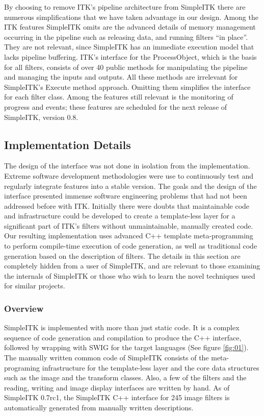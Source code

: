 \documentclass{frontiersMED} %
\begin{document}
By choosing to remove ITK's pipeline architecture from SimpleITK there
are numerous simplifications that we have taken advantage in our
design. Among the ITK features SimpleITK omits are the advanced
details of memory management occurring in the pipeline such as
releasing data, and running filters “in place”. They are not relevant,
since SimpleITK has an immediate execution model that lacks pipeline
buffering. ITK's interface for the ProcessObject, which is the basis
for all filters, consists of over 40 public methods for manipulating
the pipeline and managing the inputs and outputs. All these methods
are irrelevant for SimpleITK's Execute method approach. Omitting them
simplifies the interface for each filter class.  Among the features
still relevant is the monitoring of progress and events; these
features are scheduled for the next release of SimpleITK, version 0.8.

\subsection{Implementation Details}
The design of the interface was not done in isolation from the
implementation. Extreme software development methodologies were use to
continuously test and regularly integrate features into a stable
version.  The goals and the design of the interface presented immense
software engineering problems that had not been addressed before with
ITK. Initially there were doubts that maintainable code and
infrastructure could be developed to create a template-less layer for
a significant part of ITK's filters without unmaintainable, manually
created code. Our resulting implementation uses advanced C++ template
meta-programming to perform compile-time execution of code generation,
as well as traditional code generation based on the description of
filters. The details in this section are completely hidden from a user
of SimpleITK, and are relevant to those examining the internals of
SimpleITK or those who wish to learn the novel techniques used for
similar projects.

\subsubsection{Overview}
SimpleITK is implemented with more than just static code. It is a
complex sequence of code generation and compilation to produce the C++
interface, followed by wrapping with SWIG for the target
languages (See figure \ref{fig:01}). The manually written common code of SimpleITK consists of
the meta-programing infrastructure for the template-less layer and the
core data structures such as the image and the transform
classes. Also, a few of the filters and the reading, writing and image
display interfaces are written by hand. As of SimpleITK 0.7rc1, the
SimpleITK C++ interface for 245 image filters is automatically
generated from manually written descriptions.
\end{document}
